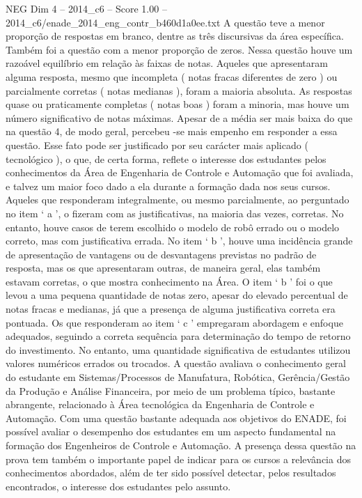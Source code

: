 \begin{textsample}{NEG Dim 4 – 2014\_c6 – Score 1.00 – 2014\_c6/enade\_2014\_eng\_contr\_b460d1a0ee.txt}
A questão teve a menor proporção de respostas em branco, dentre as três discursivas da área específica.
Também foi a questão com a menor proporção de zeros.
Nessa questão houve um razoável equilíbrio em relação às faixas de notas.
Aqueles que apresentaram alguma resposta, mesmo que incompleta ( notas fracas diferentes de zero ) ou parcialmente corretas ( notas medianas ), foram a maioria absoluta.
As respostas quase ou praticamente completas ( notas boas ) foram a minoria, mas houve um número significativo de notas máximas.
Apesar de a média ser mais baixa do que na questão 4, de modo geral, percebeu -se mais empenho em responder a essa questão.
Esse fato pode ser justificado por seu carácter mais aplicado ( tecnológico ), o que, de certa forma, reflete o interesse dos estudantes pelos conhecimentos da Área de Engenharia de Controle e Automação que foi avaliada, e talvez um maior foco dado a ela durante a formação dada nos seus cursos.
Aqueles que responderam integralmente, ou mesmo parcialmente, ao perguntado no item ‘ a ’, o fizeram com as justificativas, na maioria das vezes, corretas.
No entanto, houve casos de terem escolhido o modelo de robô errado ou o modelo correto, mas com justificativa errada.
No item ‘ b ’, houve uma incidência grande de apresentação de vantagens ou de desvantagens previstas no padrão de resposta, mas os que apresentaram outras, de maneira geral, elas também estavam corretas, o que mostra conhecimento na Área.
O item ‘ b ’ foi o que levou a uma pequena quantidade de notas zero, apesar do elevado percentual de notas fracas e medianas, já que a presença de alguma justificativa correta era pontuada.
Os que responderam ao item ‘ c ’ empregaram abordagem e enfoque adequados, seguindo a correta sequência para determinação do tempo de retorno do investimento.
No entanto, uma quantidade significativa de estudantes utilizou valores numéricos errados ou trocados.
A questão avaliava o conhecimento geral do estudante em Sistemas/Processos de Manufatura, Robótica, Gerência/Gestão da Produção e Análise Financeira, por meio de um problema típico, bastante abrangente, relacionado à Área tecnológica da Engenharia de Controle e Automação.
Com uma questão bastante adequada aos objetivos do ENADE, foi possível avaliar o desempenho dos estudantes em um aspecto fundamental na formação dos Engenheiros de Controle e Automação.
A presença dessa questão na prova tem também o importante papel de indicar para os cursos a relevância dos conhecimentos abordados, além de ter sido possível detectar, pelos resultados encontrados, o interesse dos estudantes pelo assunto.

\end{textsample}
